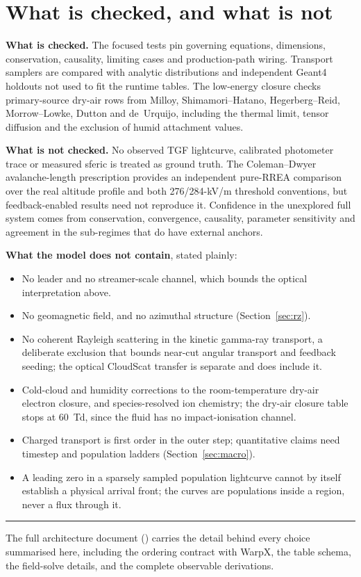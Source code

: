 \documentclass[11pt]{article}
\begin{document}
\section{What is checked, and what is not}

\textbf{What is checked.} The focused tests pin governing equations,
dimensions, conservation, causality, limiting cases and production-path
wiring. Transport samplers are compared with analytic distributions and
independent Geant4 holdouts not used to fit the runtime tables. The low-energy
closure checks primary-source dry-air rows from Milloy, Shimamori--Hatano, Hegerberg--Reid,
Morrow--Lowke, Dutton and de~Urquijo, including the thermal limit, tensor
diffusion and the exclusion of humid attachment values.

\textbf{What is not checked.} No observed TGF lightcurve, calibrated
photometer trace or measured sferic is treated as ground truth. The
Coleman--Dwyer avalanche-length prescription provides an independent
pure-RREA comparison over the real altitude profile and both 276/284-kV/m
threshold conventions, but feedback-enabled results need not reproduce it.
Confidence in the unexplored full system comes from conservation, convergence,
causality, parameter sensitivity and agreement in the sub-regimes that do have
external anchors.

\textbf{What the model does not contain}, stated plainly:

\begin{itemize}\itemsep2pt
  \item No leader and no streamer-scale channel, which bounds the optical
    interpretation above.
  \item No geomagnetic field, and no azimuthal structure (Section~\ref{sec:rz}).
  \item No coherent Rayleigh scattering in the kinetic gamma-ray transport, a
    deliberate exclusion that bounds near-cut angular transport and feedback
    seeding; the optical CloudScat transfer is separate and does include it.
  \item Cold-cloud and humidity corrections to the room-temperature dry-air
    electron closure, and species-resolved ion chemistry; the dry-air closure
    table stops at 60~Td, since the fluid has no impact-ionisation channel.
  \item Charged transport is first order in the outer step; quantitative
    claims need timestep and population ladders (Section~\ref{sec:macro}).
  \item A leading zero in a sparsely sampled population lightcurve cannot by itself
    establish a physical arrival front; the curves are populations inside a region, never a flux
    through it.
\end{itemize}

\vspace{0.5em}
\hrule
\vspace{0.5em}
{\small The full architecture document
() carries the detail behind every
choice summarised here, including the ordering contract with WarpX, the table
schema, the field-solve details, and the complete observable derivations.}
\end{document}
